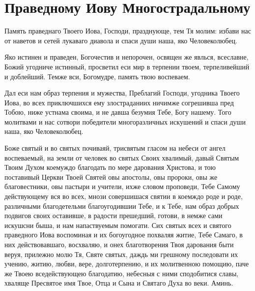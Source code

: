 

\label{_content_obiscelenii}


\section{Праведному Иову Многострадальному}\begin{mymulticols}


Память праведнаго Твоего Иова, Господи, празднующе, тем Тя молим: избави нас от наветов и сетей лукаваго диавола и спаси души наша, яко Человеколюбец.


Яко истинен и праведен, Богочестив и непорочен, освящен же явлься, всеславне, Божий угодниче истинный, просветил еси мир в терпении твоем, терпеливейший и доблейший. Темже вси, Богомудре, память твою воспеваем.


Дал еси нам образ терпения и мужества, Преблагий Господи, угодника Твоего Иова, во всех приключшихся ему злостраданиих ничимже согрешивша пред Тобою, ниже устнама своима, и не давша безумия Тебе, Богу нашему. Того молитвами и нас сотвори победители многоразличных искушений и спаси души наша, яко Человеколюбец.


Боже святый и во святых почиваяй, трисвятым гласом на небеси от ангел воспеваемый, на земли от человек во святых Своих хвалимый, давый Святым Твоим Духом коемуждо благодать по мере дарования Христова, и тою поставивый Церкви Твоей Святей овы апостолы, овы пророки, овы же благовестники, овы пастыри и учители, ихже словом проповеди, Тебе Самому действующему вся во всех, мнози совершишася святии в коемждо роде и роде, различными благодетельми благоугодившии Тебе, и к Тебе, нам образ добрых подвигов своих оставивше, в радости прешедший, готови, в немже сами искушсни быша, и нам напаствуемым помогати. Сих святых всех и святого праведного Иова воспоминая и их богоугодное похваляя житие, Тебе Самаго, в них действовавшаго, восхваляю, и онех благотворения Твоя дарования быти веруя, прилежно молю Тя, Святе святых, даждь ми грешному последовати их учению, житию, любви, вере, долготерпению, и их молитвенною помощию, паче же Твоею вседействующею благодатию, небесныя с ними сподобитися славы, хваляще Пресвятое имя Твое, Отца и Сына и Святаго Духа во веки. Аминь.

\end{mymulticols}

